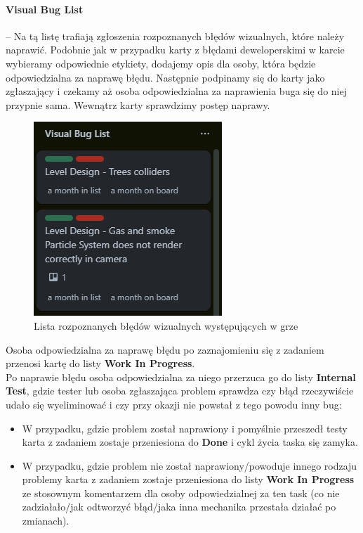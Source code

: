 \paragraph{Visual Bug List}\hspace{-1em} -- Na tą listę trafiają zgłoszenia rozpoznanych błędów wizualnych, które należy naprawić. Podobnie jak w przypadku karty z błędami deweloperskimi w karcie wybieramy odpowiednie etykiety, dodajemy opis dla osoby, która będzie odpowiedzialna za naprawę błędu. Następnie podpinamy się do karty jako zgłaszający i czekamy aż osoba odpowiedzialna za naprawienia buga się do niej przypnie sama. Wewnątrz karty sprawdzimy postęp naprawy.
\begin{figure}[h]
    \centering
    \includegraphics[scale=0.7]{Images/visBuglist.png}
    \caption{Lista rozpoznanych błędów wizualnych występujących w grze}
    \label{fig:visBuglist}
\end{figure}
\FloatBarrier
Osoba odpowiedzialna za naprawę błędu po zaznajomieniu się z zadaniem przenosi kartę do listy \textbf{Work In Progress}. \\
Po naprawie błędu osoba odpowiedzialna za niego przerzuca go do listy \textbf{Internal Test}, gdzie tester lub osoba zgłaszająca problem sprawdza czy błąd rzeczywiście udało się wyeliminować i czy przy okazji nie powstał z tego powodu inny bug:
\begin{itemize}
    \item W przypadku, gdzie problem został naprawiony i pomyślnie przeszedł testy karta z zadaniem zostaje przeniesiona do \textbf{Done} i cykl życia taska się zamyka.
    \item W przypadku, gdzie problem nie został naprawiony/powoduje innego rodzaju problemy karta z zadaniem zostaje przeniesiona do listy \textbf{Work In Progress} ze stosownym komentarzem dla osoby odpowiedzialnej za ten task (co nie zadziałało/jak odtworzyć błąd/jaka inna mechanika przestała działać po zmianach).
\end{itemize}